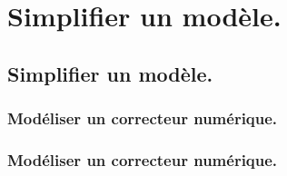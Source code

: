 \documentclass[10pt,fleqn]{book}
\newcommand{\repRel}{../..}
\newcommand{\repStyle}{\repRel/Style}
\begin{document}
\def\xxcompetences{}
\def\xxfigures{}
\graphicspath{{\repStyle/png/}}
\setlength{\columnseprule}{.1pt}

\def\xxpartie{}
\def\xxnumpartie{}
\def\xxchapitre{}
\def\xxnumchapitre{}
\def\xxactivite{DDS 3}
\def\xxtitreexo{Les ptits devoirs du soir}
\def\xxsourceexo{Xavier Pessoles}

\pagestyle{fancy}
\thispagestyle{plain}
\vspace{4.5cm}
\proftrue




\chapter{Simplifier un modèle.} 

\section{Simplifier un modèle.} 

\subsection{Modéliser un correcteur numérique. } 

\subsection{Modéliser un correcteur numérique. } 
\end{document}
